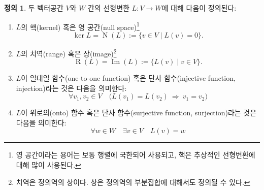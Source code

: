 \documentclass[unfonts,oneside,a4paper]{oblivoir}
\theoremstyle{definition}
\newtheorem{definition}{정의}[section]
\theoremstyle{theorem}
\theoremstyle{theorem}
\theoremstyle{remark}
\theoremstyle{remark}
\theoremstyle{remark}
\theoremstyle{remark}
\renewcommand{\vec}[1]{\bm{\mathit{#1}}}
\newcommand{\vecz}{\bm{\mathrm{0}}}
\DeclareMathOperator{\Null}{N}
\DeclareMathOperator{\Image}{Im}
\DeclareMathOperator{\Range}{R}
\begin{document}
\begin{definition}
    두 벡터공간 $V$와 $W$ 간의 선형변환 $L: V \rightarrow W$에 대해 다음이 정의된다:
    \begin{enumerate}
        \item $L$의 핵(kernel) 혹은 영 공간(null space)\footnote{영 공간이라는 용어는 보통 행렬에 국한되어 사용되고, 핵은 추상적인 선형변환에 대해 많이 사용된다.}
            \begin{equation*}
                \ker L = \Null (L) := \{\vec v \in V \mid L(\vec v) = \vecz\}.
            \end{equation*} 
        \item $L$의 치역(range) 혹은 상(image)\footnote{치역은 정의역의 상이다. 상은 정의역의 부분집합에 대해서도 정의될 수 있다.}
            \begin{equation*}
                \Range (L) = \Image (L) := \{L(\vec v) \mid \vec v \in V\}.
            \end{equation*}
        \item $L$이 일대일 함수(one-to-one function) 혹은 단사 함수(injective function, injection)라는 것은 다음을 의미한다:
            \begin{equation*}
                \forall \vec v_1, \vec v_2 \in V \quad \bigl(L(\vec v_1) = L(\vec v_2)\ \Rightarrow\ \vec v_1 = \vec v_2\bigr)
            \end{equation*}
        \item $L$이 위로의(onto) 함수 혹은 단사 함수(surjective function, surjection)라는 것은 다음을 의미한다:
            \begin{equation*}
                \forall \vec w \in W \quad \exists \vec v \in V \quad L(\vec v) = \vec w
            \end{equation*}
    \end{enumerate}
\end{definition}
\end{document}
